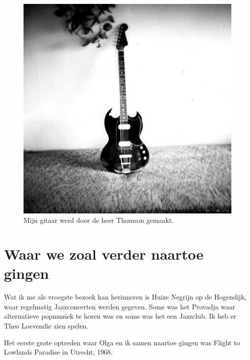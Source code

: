 \documentclass[12pt,twoside, openright]{memoir}
\begin{document}
\begin{figure}
\centering
\includegraphics[width=\textwidth]{img/ch30/Devotions.jpg}
\caption*{\footnotesize Mijn gitaar werd door de heer Thomson gemaakt.}
\end{figure} 

\section*{Waar we zoal verder naartoe gingen} %
\label{cha:naartoegaan}

Wat ik me als vroegste bezoek kan herinneren is Huize Negrijn op de Hogendijk, waar regelmatig Jazzconcerten werden gegeven. Soms was het Provadja waar alternatieve popmuziek te horen was en soms was het een Jazzclub. Ik heb er Theo Loevendie zien spelen.

Het eerste grote optreden waar Olga en ik samen naartoe gingen was Flight to Lowlands Paradise in Utrecht, 1968.
\end{document}
